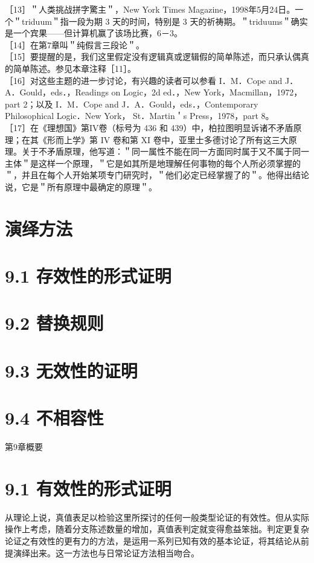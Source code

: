 ［13］＂人类挑战拼字驚主＂，New York Times Magazine，1998年5月24日。一个＂triduum＂指一段为期 3 天的时间，特别是 3 天的祈祷期。＂triduums＂确实是一个宾果——但计算机赢了该场比赛，6－3。\\
［14］在第7章叫＂纯假言三段论＂。\\
［15］要提醒的是，我们这里假定没有逻辑真或逻辑假的简单陈述，而只承认偶真的简单陈述。参见本章注释［11］。\\
［16］对这些主题的进一步讨论，有兴趣的读者可以参看 I．M．Cope and J．A．Gould，eds．，Readings on Logic，2d ed．，New York，Macmillan，1972，part 2；以及 I．M．Cope and J．A．Gould，eds．，Contemporary Philosophical Logic．New York， St．Martin＇s Press，1978，part 8。\\
［17］在《理想国》第IV卷（标号为 436 和 439）中，柏拉图明显诉诸不矛盾原理；在其《形而上学》第 IV 卷和第 XI 卷中，亚里士多德讨论了所有这三大原理。关于不矛盾原理，他写道：＂同一属性不能在同一方面同时属于又不属于同一主体＂是这样一个原理，＂它是如其所是地理解任何事物的每个人所必须掌握的＂，并且在每个人开始某项专门研究时，＂他们必定已经掌握了的＂。他得出结论说，它是＂所有原理中最确定的原理＂。

\section*{演绎方法}
\section*{9.1 存效性的形式证明}
\section*{9.2 替换规则}
\section*{9.3 无效性的证明}
\section*{9.4 不相容性}
第9章概要

\section*{9.1 有效性的形式证明}
从理论上说，真值表足以检验这里所探讨的任何一般类型论证的有效性。但从实际操作上考虑，随着分支陈述数量的增加，真值表判定就变得愈益笨拙。判定更复杂论证之有效性的更有力的方法，是运用一系列已知有效的基本论证，将其结论从前提演绎出来。这一方法也与日常论证方法相当吻合。

